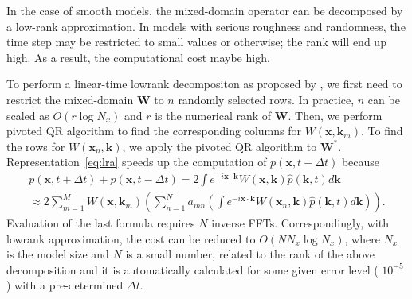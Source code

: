 In the case of smooth models, the mixed-domain operator can be decomposed by a low-rank approximation.  In models with serious roughness and randomness, the time step may be restricted to small values or otherwise; the rank will end up high. As a result, the computational cost maybe high.

To perform a linear-time lowrank decompositon as proposed by \cite{lr},
we first need to restrict the mixed-domain $\mathbf{W}$ to $n$ randomly selected rows.
In practice, $n$ can be scaled as $O(r \log N_x)$ and $r$ is the numerical rank of $\mathbf{W}$. 
Then, we perform pivoted QR algorithm \cite[]{golub} to find the corresponding columns for 
$W(\mathbf{x},\mathbf{k}_m)$.
To find the rows for $W(\mathbf{x}_n,\mathbf{k})$, we apply the pivoted QR algorithm to $\mathbf{W}^*$.\\ 

Representation~\ref{eq:lra} speeds up the computation of
$p(\mathbf{x},t+\Delta t)$ because 
\begin{eqnarray}
\nonumber
  p(\mathbf{x},t+\Delta t) + p(\mathbf{x},t-\Delta t)  =  2 \int e^{-i \mathbf{x} \cdot \mathbf{k}} W(\mathbf{x},\mathbf{k}) \hat{p}(\mathbf{k},t) d \mathbf{k}
\\
  \approx  2 \sum\limits_{m=1}^M W(\mathbf{x},\mathbf{k}_m) \left( \sum\limits_{n=1}^N a_{mn} \left(\int e^{-i \mathbf{x} \cdot \mathbf{k}} W(\mathbf{x}_n,\mathbf{k}) \hat{p}(\mathbf{k},t) d\mathbf{k} \right) \right).
\label{eq:fftwave}
\end{eqnarray}
Evaluation of the last formula requires $N$ inverse FFTs. 
Correspondingly, with lowrank approximation, the cost can be reduced to $O(NN_x\log N_x)$, 
where $N_x$ is the model size and $N$ is a small number, related to the rank of the above decomposition 
and it is automatically calculated for some given error level ( $10^{-5}$ ) with a pre-determined $\Delta t$.  

